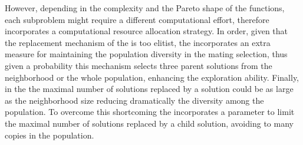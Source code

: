%
However, depending in the complexity and the Pareto shape of the functions, each subproblem might require a different computational effort, therefore \MOEADDE{} incorporates a computational resource allocation strategy.
%
In order, given that the replacement mechanism of the \MOEAD{} is too elitist, the \MOEADDE{} incorporates an extra measure for maintaining the population diversity in the mating selection, thus given a probability this mechanism selects three parent solutions from the neighborhood or the whole population, enhancing the exploration ability.
%
Finally, in the \MOEAD{} the maximal number of solutions replaced by a solution could be as large as the neighborhood size reducing dramatically the diversity among the population.
%
To overcome this shortcoming the \MOEADDE{} incorporates a parameter to limit the maximal number of solutions replaced by a child solution, avoiding to many copies in the population.
%

